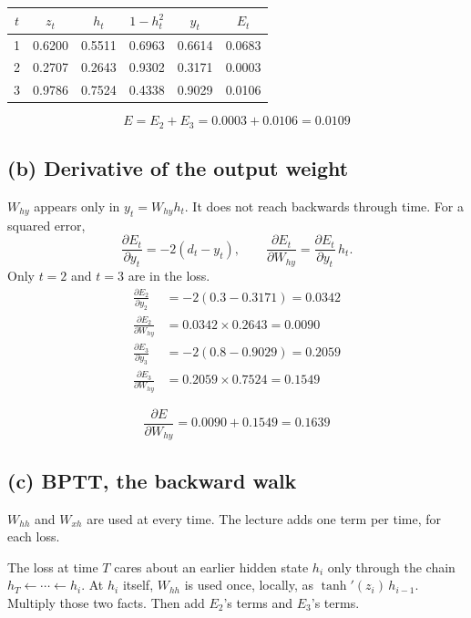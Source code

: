 \documentclass[11pt,a4paper]{article}
\begin{document}
\begin{answer}[Q1(a)]
\begin{center}
\begin{tabular}{cccccc}
\toprule
\(t\) & \(z_t\) & \(h_t\) & \(1-h_t^2\) & \(y_t\) & \(E_t\) \\
\midrule
1 & 0.6200 & 0.5511 & 0.6963 & 0.6614 & 0.0683 \\
2 & 0.2707 & 0.2643 & 0.9302 & 0.3171 & 0.0003 \\
3 & 0.9786 & 0.7524 & 0.4338 & 0.9029 & 0.0106 \\
\bottomrule
\end{tabular}
\end{center}
\[
E=E_2+E_3=0.0003+0.0106=0.0109
\]
\end{answer}

\subsection{(b) Derivative of the output weight}

\(W_{hy}\) appears only in \(y_t=W_{hy}h_t\). It does not reach backwards through time. For a squared error,
\[
\frac{\partial E_t}{\partial y_t}=-2(d_t-y_t), \qquad
\frac{\partial E_t}{\partial W_{hy}}=\frac{\partial E_t}{\partial y_t}\,h_t.
\]
Only \(t=2\) and \(t=3\) are in the loss.
\begin{align*}
\frac{\partial E_2}{\partial y_2}&=-2(0.3-0.3171)=0.0342\\
\frac{\partial E_2}{\partial W_{hy}}&=0.0342\times 0.2643=0.0090\\[0.4em]
\frac{\partial E_3}{\partial y_3}&=-2(0.8-0.9029)=0.2059\\
\frac{\partial E_3}{\partial W_{hy}}&=0.2059\times 0.7524=0.1549
\end{align*}

\begin{answer}[Q1(b)]
\[
\frac{\partial E}{\partial W_{hy}}=0.0090+0.1549=0.1639
\]
\end{answer}

\subsection{(c) BPTT, the backward walk}

\(W_{hh}\) and \(W_{xh}\) are used at every time. The lecture adds one term per time, for each loss.

\begin{idea}
The loss at time \(T\) cares about an earlier hidden state \(h_i\) only through the chain \(h_T \leftarrow \cdots \leftarrow h_i\). At \(h_i\) itself, \(W_{hh}\) is used once, locally, as \(\tanh'(z_i)\,h_{i-1}\). Multiply those two facts. Then add \(E_2\)'s terms and \(E_3\)'s terms.
\end{idea}
\end{document}
